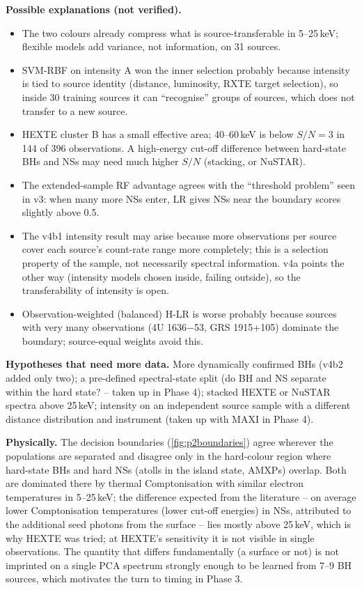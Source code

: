\textbf{Possible explanations (not verified).}
\begin{itemize}
\item The two colours already compress what is source-transferable in 5--25\,keV; flexible models add variance, not
information, on 31 sources.
\item SVM-RBF on intensity A won the inner selection probably because intensity is tied to source identity (distance,
luminosity, RXTE target selection), so inside 30 training sources it can ``recognise'' groups of sources, which does not
transfer to a new source.
\item HEXTE cluster B has a small effective area; 40--60\,keV is below $S/N=3$ in 144 of 396 observations. A
high-energy cut-off difference between hard-state BHs and NSs may need much higher $S/N$ (stacking, or NuSTAR).
\item The extended-sample RF advantage agrees with the ``threshold problem'' seen in v3: when many more NSs enter, LR gives
NSs near the boundary scores slightly above 0.5.
\item The v4b1 intensity result may arise because more observations per source cover each source's count-rate range more
completely; this is a selection property of the sample, not necessarily spectral information. v4a points the other way
(intensity models chosen inside, failing outside), so the transferability of intensity is open.
\item Observation-weighted (balanced) H-LR is worse probably because sources with very many observations
(4U 1636$-$53, GRS 1915+105) dominate the boundary; source-equal weights avoid this.
\end{itemize}

\textbf{Hypotheses that need more data.} More dynamically confirmed BHs (v4b2 added only two); a pre-defined spectral-state
split (do BH and NS separate within the hard state? -- taken up in Phase 4); stacked HEXTE or NuSTAR spectra above
25\,keV; intensity on an independent source sample with a different distance distribution and instrument (taken up with
MAXI in Phase 4).

\textbf{Physically.} The decision boundaries (\cref{fig:p2boundaries}) agree wherever the populations are separated and
disagree only in the hard-colour region where hard-state BHs and hard NSs (atolls in the island state, AMXPs) overlap.
Both are dominated there by thermal Comptonisation with similar electron temperatures in 5--25\,keV; the difference
expected from the literature -- on average lower Comptonisation temperatures (lower cut-off energies) in NSs, attributed
to the additional seed photons from the surface \citep{Burke2017} -- lies mostly above 25\,keV, which is why HEXTE was tried; at HEXTE's sensitivity it is not visible in single observations. The
quantity that differs fundamentally (a surface or not) is not imprinted on a single PCA spectrum strongly enough to be
learned from 7--9 BH sources, which motivates the turn to timing in Phase 3.

